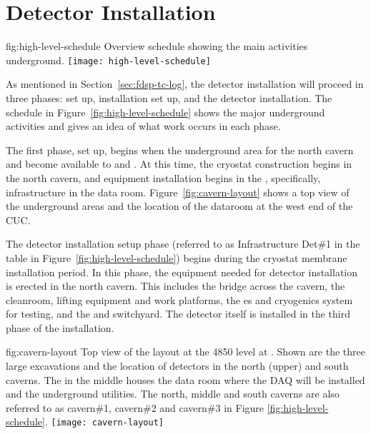 \section{Detector Installation}
\label{sec:fdsp-tc-inst}




\begin{dunefigure}{fig:high-level-schedule}
  {Overview schedule showing the main activities underground.}
\texttt{[image: high-level-schedule]}
\end{dunefigure}


As mentioned in Section~\ref{sec:fdsp-tc-log}, the  detector installation will proceed in three phases:  set up, installation set up, and the detector installation. The schedule in Figure~\ref{fig:high-level-schedule} shows the major underground activities and gives an idea of what work occurs in each phase. 

The first phase,  set up, begins when the underground area for the north cavern and  become available to  and . At this time, the  cryostat construction begins in the north cavern, and  equipment installation 
begins in the , specifically, infrastructure in the  data room. Figure~\ref{fig:cavern-layout} shows a top view of the underground areas and the location of the dataroom at the west end of the CUC. 

The detector installation setup phase (referred to as Infrastructure Det\#1 in the table in Figure~\ref{fig:high-level-schedule}) begins during the cryostat membrane installation period. 
In this phase, the equipment needed for detector installation is erected in the north cavern. This includes the bridge across the cavern, the cleanroom, lifting equipment and work platforms, the \coldbox{}es and cryogenics system for  testing, and the  and switchyard. 
The detector itself is installed in the third phase of the installation. 

\begin{dunefigure}{fig:cavern-layout}
  {Top view of the layout at the 4850 level at . Shown are the three large excavations and the location of detectors in the north (upper) and south caverns. 
  The  in the middle houses the  data room where the DAQ will be installed and the underground utilities. The north, middle and south caverns are also referred to as cavern\#1, cavern\#2 and cavern\#3 in Figure \ref{fig:high-level-schedule}.}
\texttt{[image: cavern-layout]}
\end{dunefigure}


